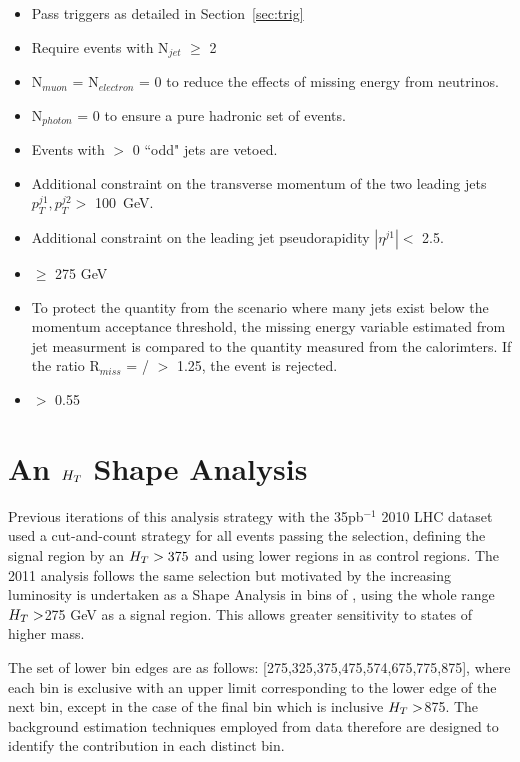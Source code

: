 \begin{itemize}
\item Pass triggers as detailed in Section~\ref{sec:trig}
\item{Require events with N$_{jet}$ $\geq$ 2}
\item N$_{muon}$ = N$_{electron}$ = 0 to reduce the effects of missing energy from neutrinos.
\item N$_{photon}$ = 0 to ensure a pure hadronic set of events.
\item Events with $>$ 0 ``odd" jets are vetoed.
\item Additional constraint on the transverse momentum of the two leading jets $p^{j1}_{T},p^{j2}_{T} >$ 100~GeV.
\item Additional constraint on the leading jet pseudorapidity $|\eta^{j1}| <$ 2.5.
\item \HT $\geq$ 275 GeV 
\item{To protect the quantity \alt from the scenario where many jets exist below the momentum acceptance threshold, the missing energy variable \mht estimated from jet measurment is compared to the quantity \met measured from the calorimters. If the ratio R$_{miss}$ = \mht / \met $>$ 1.25, the event is rejected. 
}
\item \alt $>$ 0.55
\end{itemize}




\section{An $H_{T} $ Shape Analysis}

Previous iterations of this analysis strategy with the 35pb$^{-1}$ 2010 LHC dataset \cite{35paper} used a cut-and-count strategy for all events passing the selection, defining the signal region by an $H_{T}  > 375$ and using lower regions in \HT as control regions. The 2011 analysis follows the same selection but motivated by the increasing luminosity is undertaken as a Shape Analysis in bins of \HT, using the whole range $H_{T}  > $275 GeV as a signal region. This allows greater sensitivity to states of higher mass. 

The set of lower bin edges are as follows: [275,325,375,475,574,675,775,875], where each bin is exclusive with an upper limit corresponding to the lower edge of the next bin, except in the case of the final bin which is inclusive $H_{T}  > $875. The background estimation techniques employed from data therefore are designed to identify the contribution in each distinct bin. 

